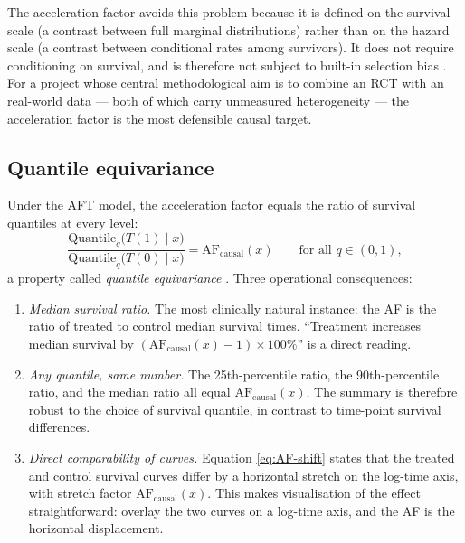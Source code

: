 \documentclass[11pt]{article}
\theoremstyle{plain}
\theoremstyle{definition}
\theoremstyle{remark}
\newcommand{\1}{\mathds{1}}
\newcommand{\AF}{\mathrm{AF}}
\begin{document}
The acceleration factor avoids this problem because it is defined on the
survival scale (a contrast between full marginal distributions) rather
than on the hazard scale (a contrast between conditional rates among
survivors). It does not require conditioning on survival, and is therefore
not subject to built-in selection bias \citep{Brathovde2024}. For a
project whose central methodological aim is to combine an RCT with an
real-world data --- both of which carry unmeasured heterogeneity ---
the acceleration factor is the most defensible causal target.

\subsection{Quantile equivariance}

Under the AFT model, the acceleration factor equals the ratio of
survival quantiles at every level:
\begin{equation}
  \frac{\mathrm{Quantile}_{q}\bigl(T(1) \mid x\bigr)}
       {\mathrm{Quantile}_{q}\bigl(T(0) \mid x\bigr)}
  = \AF_{\mathrm{causal}}(x)
  \qquad \text{for all } q \in (0, 1),
\end{equation}
a property called \emph{quantile equivariance} \citep{Wei1992,
Hougaard1999}. Three operational consequences:
\begin{enumerate}[leftmargin=*]
  \item \emph{Median survival ratio.} The most clinically natural
        instance: the AF is the ratio of treated to control median
        survival times. ``Treatment increases median survival by
        $(\AF_{\mathrm{causal}}(x) - 1)\times 100\%$'' is a direct reading.
  \item \emph{Any quantile, same number.} The 25th-percentile ratio, the
        90th-percentile ratio, and the median ratio all equal
        $\AF_{\mathrm{causal}}(x)$. The summary is therefore robust to the
        choice of survival quantile, in contrast to time-point survival
        differences.
  \item \emph{Direct comparability of curves.} Equation
        \eqref{eq:AF-shift} states that the treated and control survival
        curves differ by a horizontal stretch on the log-time axis, with
        stretch factor $\AF_{\mathrm{causal}}(x)$. This makes
        visualisation of the effect straightforward: overlay the two
        curves on a log-time axis, and the AF is the horizontal
        displacement.
\end{enumerate}
\end{document}
